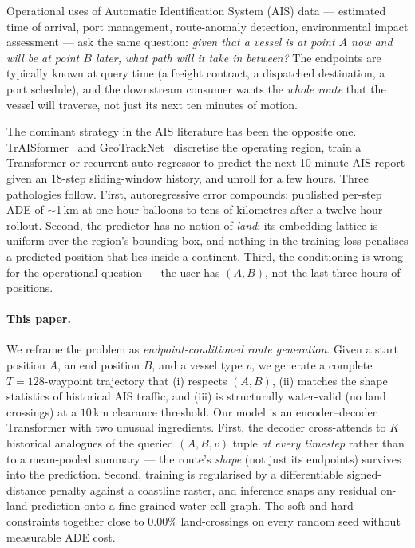 \documentclass[11pt]{article}
\begin{document}
Operational uses of Automatic Identification System (AIS) data ---
estimated time of arrival, port management, route-anomaly detection,
environmental impact assessment --- ask the same question: \emph{given
that a vessel is at point $A$ now and will be at point $B$ later, what
path will it take in between?} The endpoints are typically known at
query time (a freight contract, a dispatched destination, a port
schedule), and the downstream consumer wants the \emph{whole route}
that the vessel will traverse, not just its next ten minutes of motion.

The dominant strategy in the AIS literature has been the opposite one.
TrAISformer~\citep{traisformer2024} and GeoTrackNet~\citep{geotracknet2018}
discretise the operating region, train a Transformer or recurrent
auto-regressor to predict the next 10-minute AIS report given an 18-step
sliding-window history, and unroll for a few hours. Three pathologies
follow. First, autoregressive error compounds: published per-step ADE
of $\sim$1\,km at one hour balloons to tens of kilometres after a
twelve-hour rollout. Second, the predictor has no notion of \emph{land}:
its embedding lattice is uniform over the region's bounding box, and
nothing in the training loss penalises a predicted position that lies
inside a continent. Third, the conditioning is wrong for the operational
question --- the user has $(A, B)$, not the last three hours of
positions.

\paragraph{This paper.} We reframe the problem as
\emph{endpoint-conditioned route generation}. Given a start position
$A$, an end position $B$, and a vessel type $v$, we generate a complete
$T=128$-waypoint trajectory that (i) respects $(A, B)$, (ii) matches the
shape statistics of historical AIS traffic, and (iii) is structurally
water-valid (no land crossings) at a $10$\,km clearance threshold. Our
model is an encoder--decoder Transformer with two unusual ingredients.
First, the decoder cross-attends to $K$ historical analogues of the
queried $(A, B, v)$ tuple \emph{at every timestep} rather than to a
mean-pooled summary --- the route's \emph{shape} (not just its
endpoints) survives into the prediction. Second, training is regularised
by a differentiable signed-distance penalty against a coastline raster,
and inference snaps any residual on-land prediction onto a fine-grained
water-cell graph. The soft and hard constraints together close to
$0.00$\% land-crossings on every random seed without measurable ADE
cost.
\end{document}
